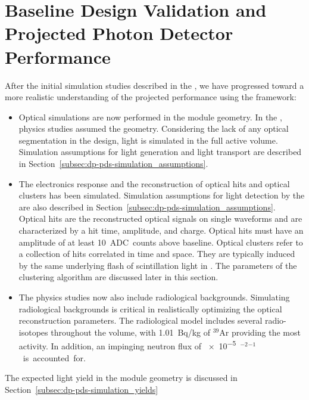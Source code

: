 \section{Baseline Design Validation and Projected Photon Detector Performance}
\label{sec:dp-pds-performance}

After the initial simulation studies described in the  \cite{Abi:2018rgm}, we have progressed toward a more realistic understanding of the projected  performance using the  framework:
%
\begin{itemize}
\item Optical simulations are now performed in the   module geometry. In the  , physics studies assumed the  geometry. Considering the lack of any optical segmentation in the  design, light is simulated in the full  active volume. Simulation assumptions for light generation and light transport are described in Section~\ref{subsec:dp-pds-simulation_assumptions}. 
%
\item The electronics response and the reconstruction of optical hits and optical clusters has been simulated. Simulation assumptions for light detection by the  are also described in Section~\ref{subsec:dp-pds-simulation_assumptions}. Optical hits are the reconstructed optical signals on single  waveforms and are characterized by a hit time, amplitude, and charge. Optical hits must have an amplitude of at least \SI{10}{ADC counts} above baseline. Optical clusters refer to a collection of  hits correlated in time and space. They are typically induced by the same underlying flash of scintillation light in \lar. The parameters of the clustering algorithm are discussed later in this section.

%
\item The physics studies now also include radiological backgrounds. Simulating radiological backgrounds is critical in realistically optimizing the optical reconstruction parameters. The radiological model includes several radio-isotopes throughout the \lar volume, with \SI{1.01}{\becquerel/\kg} of $^{39}$Ar providing the most activity. In addition, an impinging neutron flux of \SI{e-5}{\cm$^{-2}$\s$^{-1}$} is accounted for.
\end{itemize} 

The expected  light yield in the   module geometry is discussed in Section~\ref{subsec:dp-pds-simulation_yields}

